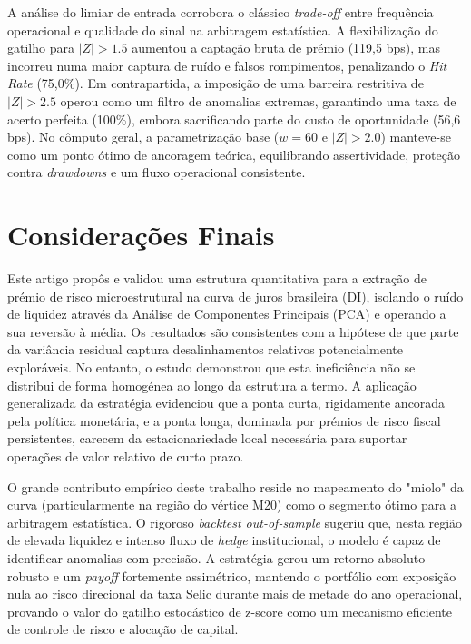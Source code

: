 \documentclass[fleqn]{rbfin}
\begin{document}
A análise do limiar de entrada corrobora o clássico \textit{trade-off} entre frequência operacional e qualidade do sinal na arbitragem estatística. A flexibilização do gatilho para $|Z| > 1.5$ aumentou a captação bruta de prémio (119,5 bps), mas incorreu numa maior captura de ruído e falsos rompimentos, penalizando o \textit{Hit Rate} (75,0\%). Em contrapartida, a imposição de uma barreira restritiva de $|Z| > 2.5$ operou como um filtro de anomalias extremas, garantindo uma taxa de acerto perfeita (100\%), embora sacrificando parte do custo de oportunidade (56,6 bps). No cômputo geral, a parametrização base ($w=60$ e $|Z|>2.0$) manteve-se como um ponto ótimo de ancoragem teórica, equilibrando assertividade, proteção contra \textit{drawdowns} e um fluxo operacional consistente.



\section{Considerações Finais}

Este artigo propôs e validou uma estrutura quantitativa para a extração de prémio de risco microestrutural na curva de juros brasileira (DI), isolando o ruído de liquidez através da Análise de Componentes Principais (PCA) e operando a sua reversão à média. Os resultados são consistentes com a hipótese de que parte da variância residual captura desalinhamentos relativos potencialmente exploráveis. No entanto, o estudo demonstrou que esta ineficiência não se distribui de forma homogénea ao longo da estrutura a termo. A aplicação generalizada da estratégia evidenciou que a ponta curta, rigidamente ancorada pela política monetária, e a ponta longa, dominada por prémios de risco fiscal persistentes, carecem da estacionariedade local necessária para suportar operações de valor relativo de curto prazo.

O grande contributo empírico deste trabalho reside no mapeamento do "miolo" da curva (particularmente na região do vértice M20) como o segmento ótimo para a arbitragem estatística. O rigoroso \textit{backtest out-of-sample} sugeriu que, nesta região de elevada liquidez e intenso fluxo de \textit{hedge} institucional, o modelo é capaz de identificar anomalias com precisão. A estratégia gerou um retorno absoluto robusto e um \textit{payoff} fortemente assimétrico, mantendo o portfólio com exposição nula ao risco direcional da taxa Selic durante mais de metade do ano operacional, provando o valor do gatilho estocástico de z-score como um mecanismo eficiente de controle de risco e alocação de capital.
\end{document}
